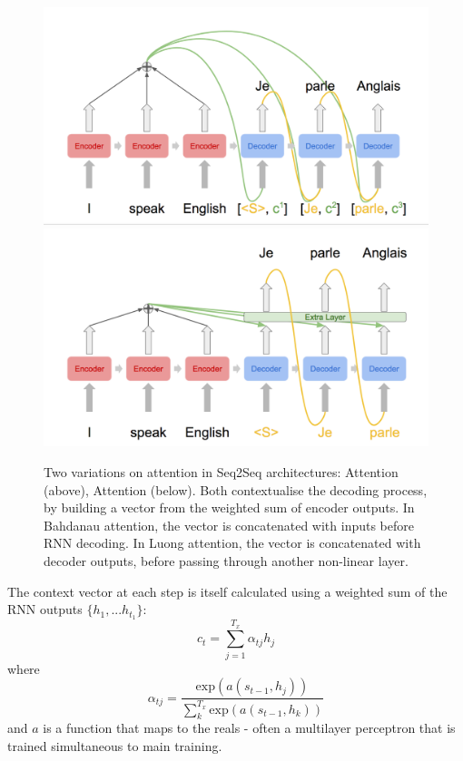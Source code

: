 \begin{figure}[h!]{}
    \centering

    \includegraphics[width=.7\linewidth]{ModelPics/bahd_diag.png}
    \includegraphics[width=.7\linewidth]{ModelPics/luong_diag2.png}
    \caption{Two variations on attention in Seq2Seq architectures: \citet{bahdanau_neural_2014} Attention (above), \citet{luong_effective_2015} Attention (below). Both contextualise the decoding process, by building a vector from the weighted sum of encoder outputs. In Bahdanau attention, the vector is concatenated with inputs before RNN decoding. In Luong attention, the vector is concatenated with decoder outputs, before passing through another non-linear layer.}
    \label{fig:attention} 

\end{figure}

The context vector at each step is itself calculated using a weighted sum of the RNN outputs $\{h_1,... h_{t_1}\}$:
\begin{equation}
c_t = \sum_{j=1}^{T_x}\alpha_{tj}h_j
\end{equation}
where
\begin{equation}
\alpha_{tj} = \dfrac{\text{exp}(a(s_{t-1}, h_j))}{\sum_k^{T_x}\text{exp}(a(s_{t-1}, h_k))}
\end{equation}
and $a$ is a function that maps to the reals - often a multilayer perceptron that is trained simultaneous to main training. 

